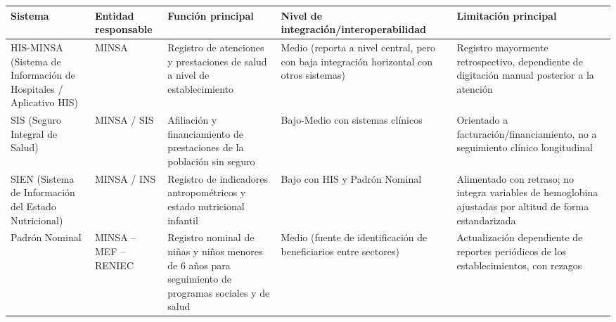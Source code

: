 \documentclass[11pt,a4paper]{article}
\begin{document}
{\small
\begin{longtable}[]{@{}
  >{\raggedright\arraybackslash}p{}
  >{\raggedright\arraybackslash}p{}
  >{\raggedright\arraybackslash}p{}
  >{\raggedright\arraybackslash}p{}
  >{\raggedright\arraybackslash}p{}@{}}
\toprule\noalign{}
\begin{minipage}[b]{\linewidth}\raggedright
Sistema
\end{minipage} & \begin{minipage}[b]{\linewidth}\raggedright
Entidad responsable
\end{minipage} & \begin{minipage}[b]{\linewidth}\raggedright
Función principal
\end{minipage} & \begin{minipage}[b]{\linewidth}\raggedright
Nivel de integración/interoperabilidad
\end{minipage} & \begin{minipage}[b]{\linewidth}\raggedright
Limitación principal
\end{minipage} \\
\midrule\noalign{}
\endhead
\bottomrule\noalign{}
\endlastfoot
HIS-MINSA (Sistema de Información de Hospitales / Aplicativo HIS) & MINSA & Registro de atenciones y prestaciones de salud a nivel de establecimiento & Medio (reporta a nivel central, pero con baja integración horizontal con otros sistemas) & Registro mayormente retrospectivo, dependiente de digitación manual posterior a la atención \\
SIS (Seguro Integral de Salud) & MINSA / SIS & Afiliación y financiamiento de prestaciones de la población sin seguro & Bajo-Medio con sistemas clínicos & Orientado a facturación/financiamiento, no a seguimiento clínico longitudinal \\
SIEN (Sistema de Información del Estado Nutricional) & MINSA / INS & Registro de indicadores antropométricos y estado nutricional infantil & Bajo con HIS y Padrón Nominal & Alimentado con retraso; no integra variables de hemoglobina ajustadas por altitud de forma estandarizada \\
Padrón Nominal & MINSA -- MEF -- RENIEC & Registro nominal de niñas y niños menores de 6 años para seguimiento de programas sociales y de salud & Medio (fuente de identificación de beneficiarios entre sectores) & Actualización dependiente de reportes periódicos de los establecimientos, con rezagos \\

\end{longtable}}
\end{document}
